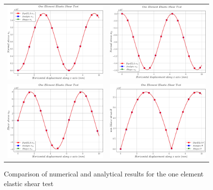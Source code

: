 \begin{figure}[h]
\begin{centering}
\begin{tabular}{cc}
\includegraphics[width=0.45\columnwidth]{Figures/Samples/Element/Shear-Elastic_stress_11} & \includegraphics[width=0.45\columnwidth]{Figures/Samples/Element/Shear-Elastic_stress_22}\tabularnewline
\includegraphics[width=0.45\columnwidth]{Figures/Samples/Element/Shear-Elastic_stress_12} & \includegraphics[width=0.45\columnwidth]{Figures/Samples/Element/Shear-Elastic_vonMises}\tabularnewline
\end{tabular}
\par\end{centering}
\caption{Comparison of numerical and analytical results for the one element
elastic shear test\label{fig:Samples!Single!Shear-Elastic-Comparison}}
\end{figure}
\clearpage

